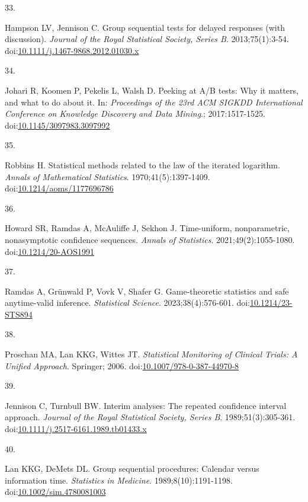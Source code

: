 \documentclass[
  11pt,
]{article}
\newlength{\cslhangindent}
\newlength{\csllabelwidth}
\newenvironment{CSLReferences}[2] %
 {\begin{list}{}{%
  \setlength{\itemindent}{0pt}
  \setlength{\leftmargin}{0pt}
  \setlength{\parsep}{0pt}
  \ifodd #1
   \setlength{\leftmargin}{\cslhangindent}
   \setlength{\itemindent}{-1\cslhangindent}
  \fi
  \setlength{\itemsep}{#2\baselineskip}}}
 {\end{list}}
\newcommand{\CSLLeftMargin}[1]{\parbox[t]{\csllabelwidth}{\strut#1\strut}}
\newcommand{\CSLRightInline}[1]{\parbox[t]{\linewidth - \csllabelwidth}{\strut#1\strut}}
\begin{document}
\begin{CSLReferences}{0}{1}
\CSLLeftMargin{33. }%
\CSLRightInline{Hampson LV, Jennison C. Group sequential tests for delayed responses (with discussion). \emph{Journal of the Royal Statistical Society, Series B}. 2013;75(1):3-54. doi:\href{https://doi.org/10.1111/j.1467-9868.2012.01030.x}{10.1111/j.1467-9868.2012.01030.x}}

\CSLLeftMargin{34. }%
\CSLRightInline{Johari R, Koomen P, Pekelis L, Walsh D. Peeking at {A/B} tests: Why it matters, and what to do about it. In: \emph{Proceedings of the 23rd ACM SIGKDD International Conference on Knowledge Discovery and Data Mining}.; 2017:1517-1525. doi:\href{https://doi.org/10.1145/3097983.3097992}{10.1145/3097983.3097992}}

\CSLLeftMargin{35. }%
\CSLRightInline{Robbins H. Statistical methods related to the law of the iterated logarithm. \emph{Annals of Mathematical Statistics}. 1970;41(5):1397-1409. doi:\href{https://doi.org/10.1214/aoms/1177696786}{10.1214/aoms/1177696786}}

\CSLLeftMargin{36. }%
\CSLRightInline{Howard SR, Ramdas A, McAuliffe J, Sekhon J. Time-uniform, nonparametric, nonasymptotic confidence sequences. \emph{Annals of Statistics}. 2021;49(2):1055-1080. doi:\href{https://doi.org/10.1214/20-AOS1991}{10.1214/20-AOS1991}}

\CSLLeftMargin{37. }%
\CSLRightInline{Ramdas A, Grünwald P, Vovk V, Shafer G. Game-theoretic statistics and safe anytime-valid inference. \emph{Statistical Science}. 2023;38(4):576-601. doi:\href{https://doi.org/10.1214/23-STS894}{10.1214/23-STS894}}

\CSLLeftMargin{38. }%
\CSLRightInline{Proschan MA, Lan KKG, Wittes JT. \emph{Statistical Monitoring of Clinical Trials: A Unified Approach}. Springer; 2006. doi:\href{https://doi.org/10.1007/978-0-387-44970-8}{10.1007/978-0-387-44970-8}}

\CSLLeftMargin{39. }%
\CSLRightInline{Jennison C, Turnbull BW. Interim analyses: The repeated confidence interval approach. \emph{Journal of the Royal Statistical Society, Series B}. 1989;51(3):305-361. doi:\href{https://doi.org/10.1111/j.2517-6161.1989.tb01433.x}{10.1111/j.2517-6161.1989.tb01433.x}}

\CSLLeftMargin{40. }%
\CSLRightInline{Lan KKG, DeMets DL. Group sequential procedures: Calendar versus information time. \emph{Statistics in Medicine}. 1989;8(10):1191-1198. doi:\href{https://doi.org/10.1002/sim.4780081003}{10.1002/sim.4780081003}}


\end{CSLReferences}
\end{document}
